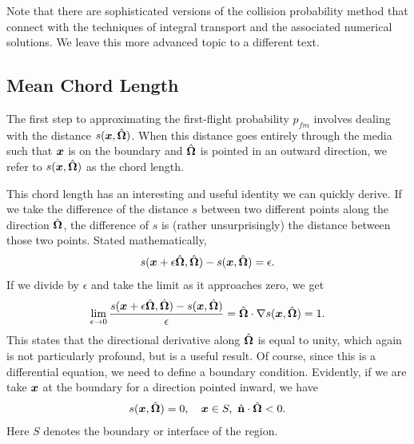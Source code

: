 Note that there are sophisticated versions of the collision probability method that connect with the techniques of integral transport and the associated numerical solutions. We leave this more advanced topic to a different text. 

\subsection{Mean Chord Length}

The first step to approximating the first-flight probability $p_{fm}$ involves dealing with the distance $s(\bm{x},\hat{\mathbf{\Omega}})$. When this distance goes entirely through the media such that $\bm{x}$ is on the boundary and $\hat{\mathbf{\Omega}}$ is pointed in an outward direction, we refer to $s(\bm{x},\hat{\mathbf{\Omega}})$ as the chord length.

This chord length has an interesting and useful identity we can quickly derive. If we take the difference of the distance $s$ between two different points along the direction $\hat{\mathbf{\Omega}}$, the difference of $s$ is (rather unsurprisingly) the distance between those two points. Stated mathematically,
\begin{align}
  s(\bm{x} + \epsilon \hat{\mathbf{\Omega}}, \hat{\mathbf{\Omega}} ) - s(\bm{x},\hat{\mathbf{\Omega}}) = \epsilon . \nonumber
\end{align}
If we divide by $\epsilon$ and take the limit as it approaches zero, we get
\begin{align}
  \lim_{\epsilon \rightarrow 0} \frac{ s(\bm{x} + \epsilon \hat{\mathbf{\Omega}}, \hat{\mathbf{\Omega}} ) - s(\bm{x},\hat{\mathbf{\Omega}}) }{ \epsilon } = \hat{\mathbf{\Omega}} \cdot \nabla s(\bm{x},\hat{\mathbf{\Omega}}) = 1. \label{Eq:thermalization_chordLengthDirectionalDerivative}
\end{align}
This states that the directional derivative along $\hat{\mathbf{\Omega}}$ is equal to unity, which again is not particularly profound, but is a useful result. Of course, since this is a differential equation, we need to define a boundary condition. Evidently, if we are take $\bm{x}$ at the boundary for a direction pointed inward, we have
\begin{align}
  s(\bm{x},\hat{\mathbf{\Omega}}) = 0, \quad \bm{x} \in S, \ \hat{\mathbf{n}} \cdot \hat{\mathbf{\Omega}} < 0. \label{Eq:thermalization_chordLengthDirectionalDerivative_BoundaryCondition}
\end{align}
Here $S$ denotes the boundary or interface of the region.

